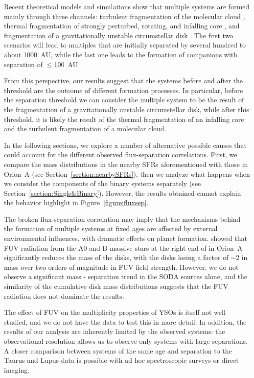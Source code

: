 \documentclass{aa}
\begin{document}
Recent theoretical models and simulations show that multiple systems are formed mainly through three channels: turbulent fragmentation of the molecular cloud \citep[e.g.,][]{Kawasaki23}, thermal fragmentation of strongly perturbed, rotating, and infalling core \citep[e.g.,][]{Boss13, Boss14}, and fragmentation of a gravitationally unstable circumstellar disk \citep[e.g.,][]{Longarini23, Stamatellos09}. The first two scenarios will lead to multiples that are initially separated by several hundred to about 1000~AU, while the last one leads to the formation of companions with separation of $\leq$100~AU \citep[e.g.,][]{Tobin13, Takakuwa12}. \par
From this perspective, our results suggest that the systems before and after the threshold are the outcome of different formation processes. In particular, before the separation threshold we can consider the multiple system to be the result of the fragmentation of a gravitationally unstable circumstellar disk, while after this threshold, it is likely the result of the thermal fragmentation of an infalling core and the turbulent fragmentation of a molecular cloud. \par
In the following sections, we explore a number of alternative possible causes that could account for the different observed flux-separation correlations. First, we compare the mass distributions in the nearby SFRs aforementioned with those in Orion~A (see Section~\ref{section:nearbySFRs}), then we analyze what happens when we consider the components of the binary systems separately (see Section~\ref{section:Single&Binary}). However, the results obtained cannot explain the behavior highlight in Figure~\ref{figure:fluxsep}. \par 
The broken flux-separation correlation may imply that the mechanisms behind the formation of multiple systems at fixed ages are affected by external environmental influences, with dramatic effects on planet formation. \cite{VanTerwisga23} showed that FUV radiation from the A0 and B massive stars at the right end of in Orion~A significantly reduces the mass of the disks, with the disks losing a factor of $\sim$2 in mass over two orders of magnitude in FUV field strength. However, we do not observe a significant mass - separation trend in the SODA sources alone, and the similarity of the cumulative disk mass distributions suggests that the FUV radiation does not dominate the results. \par
The effect of FUV on the multiplicity properties of YSOs is itself not well studied, and we do not have the data to test this in more detail. In addition, the results of our analysis are inherently limited by the observed systems: the observational resolution allows us to observe only systems with large separations. A closer comparison between systems of the same age and separation to the Taurus and Lupus data is possible with ad hoc spectroscopic surveys or direct imaging. 
\end{document}
